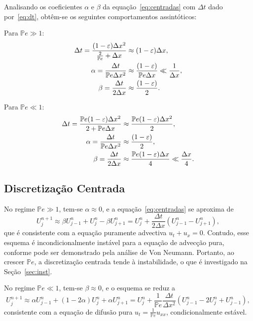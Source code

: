 \documentclass[12pt, a4paper]{article}
\newcommand{\bb}[1]{\mathbb{#1}}
\newcommand{\D}[1]{\Delta#1}
\newcommand{\Pe}{\bb{P}e}
\begin{document}
    \vspace{.2cm}

    Analisando os coeficientes $\alpha$ e $\beta$ da equação~\eqref{eq:centradas} com $\D{t}$ dado por~\eqref{eq:dt}, obtêm-se os seguintes comportamentos assintóticos:

    Para $\Pe \gg 1$:
    \begin{align}
        \D{t} = \frac{(1-\varepsilon)\D{x^2}}{\frac{2}{\Pe} + \D{x}} &\approx (1-\varepsilon) \D{x}, \notag \\
        \alpha = \frac{\D{t}}{\Pe \D{x^2}} &\approx \frac{(1-\varepsilon)}{\Pe \D{x}} \ll \frac{1}{\D{x}}, \notag \\
        \beta = \frac{\D{t}}{2 \D{x}} &\approx \frac{(1- \varepsilon)}{2}. \notag
    \end{align}

    Para $\Pe \ll 1$:
    \begin{align}
        \D{t} = \frac{\Pe (1-\varepsilon)\D{x^2}}{2 + \Pe \D{x}} &\approx \frac{\Pe (1-\varepsilon)\D{x^2}}{2}, \notag \\
        \alpha = \frac{\D{t}}{\Pe \D{x^2}} &\approx \frac{(1-\varepsilon)}{2}, \notag \\
        \beta = \frac{\D{t}}{2 \D{x}} &\approx \frac{\Pe(1-\varepsilon)\D{x}}{4} \ll \frac{\D{x}}{4}. \notag
    \end{align}

    \subsection{Discretização Centrada}

    No regime $\Pe \gg 1$, tem-se $\alpha \approx 0$, e a equação~\eqref{eq:centradas} se aproxima de
    \[
        U_j^{n+1} \approx \beta U_{j-1}^n + U_j^n -\beta U_{j+1}^n = U_j^n + \frac{\D{t}}{2\D{x}}(U_{j-1}^n - U_{j+1}^n),
    \]
    que é consistente com a equação puramente advectiva $u_t + u_x = 0$. Contudo, esse esquema é incondicionalmente instável para a equação de advecção pura, conforme pode ser demonstrado pela análise de Von Neumann. Portanto, ao crescer $\Pe$, a discretização centrada tende à instabilidade, o que é investigado na Seção~\ref{sec:inst}.

    No regime $\Pe \ll 1$, tem-se $\beta \approx 0$, e o esquema se reduz a
    \[
        U_j^{n+1} \approx \alpha U_{j-1}^n + (1 - 2\alpha) U_{j}^n + \alpha U_{j+1}^n = U_{j}^n + \frac{1}{\Pe}\frac{\D{t}}{\D{x^2}}(U_{j-1}^n - 2 U_{j}^n + U_{j-1}^n),
    \]
    consistente com a equação de difusão pura $u_t = \frac{1}{\Pe} u_{xx}$, condicionalmente estável.
\end{document}
